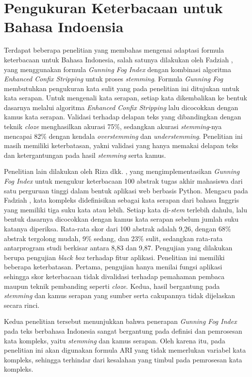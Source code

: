 \section{Pengukuran Keterbacaan untuk Bahasa Indoensia }
Terdapat beberapa penelitian yang membahas mengenai adaptasi formula keterbacaan untuk Bahasa Indonesia, salah satunya dilakukan oleh Fadziah \cite{fadziah2017penerapan}, yang menggunakan formula \textit{Gunning Fog Index} dengan kombinasi algoritma \textit{Enhanced Confix Stripping} untuk proses \textit{stemming}. Formula \textit{Gunning Fog} membutuhkan pengukuran kata sulit yang pada penelitian ini ditujukan untuk kata serapan. Untuk mengenali kata serapan, setiap kata dikembalikan ke bentuk dasarnya melalui algoritma \textit{Enhanced Confix Stripping} lalu dicocokkan dengan kamus kata serapan. Validasi terhadap delapan teks yang dibandingkan dengan teknik \textit{cloze} menghasilkan akurasi 75\%, sedangkan akurasi \textit{stemming}-nya mencapai 82\% dengan kendala \textit{overstemming} dan \textit{understemming}.
Penelitian ini masih memiliki keterbatasan, yakni validasi yang hanya memakai delapan teks dan ketergantungan pada hasil \textit{stemming} serta kamus. 

Penelitian lain dilakukan oleh Riza dkk. \cite{riza2024implementasi}, yang
mengimplementasikan \textit{Gunning Fog Index} untuk mengukur keterbacaan
100 abstrak tugas akhir mahasiswa dari satu perguruan tinggi dalam bentuk
aplikasi web berbasis Python. Mengacu pada Fadziah
\cite{fadziah2017penerapan}, kata kompleks didefinisikan sebagai kata
serapan dari bahasa Inggris yang memiliki tiga suku kata atau lebih.
Setiap kata di-\textit{stem} terlebih dahulu, lalu bentuk dasarnya
dicocokkan dengan kamus kata serapan sebelum jumlah suku katanya
diperiksa. Rata-rata skor dari 100 abstrak adalah 9,26, dengan 68\%
abstrak tergolong mudah, 9\% sedang, dan 23\% sulit, sedangkan rata-rata
antarprogram studi berkisar antara 8,83 dan 9,87. Pengujian yang
dilakukan berupa pengujian \textit{black box} terhadap fitur aplikasi.
Penelitian ini memiliki beberapa keterbatasan. Pertama, pengujian hanya
menilai fungsi aplikasi sehingga skor keterbacaan tidak divalidasi
terhadap pemahaman pembaca maupun teknik pembanding seperti
\textit{cloze}. Kedua, hasil bergantung pada \textit{stemming} dan kamus
serapan yang sumber serta cakupannya tidak dijelaskan secara rinci. 

Kedua penelitian tersebut menunjukkan bahwa penerapan
\textit{Gunning Fog Index} pada teks berbahasa Indonesia sangat bergantung
pada definisi dan pemrosesan kata kompleks, yaitu \textit{stemming} dan
kamus serapan. Oleh karena itu, pada penelitian ini akan digunakan formula ARI yang tidak memerlukan variabel kata kompleks, sehingga terhindar dari kesalahan yang timbul pada pemrosesan kata kompleks.

